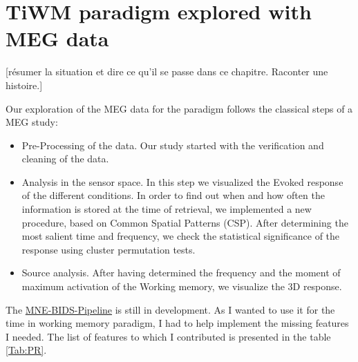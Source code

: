 \chapter{TiWM paradigm explored with MEG data}




 [résumer la situation et dire ce qu'il se passe dans ce chapitre. Raconter une histoire.]


Our exploration of the MEG data for the paradigm follows the classical steps of a MEG study:

\begin{itemize}
    \item Pre-Processing of the data. Our study started with the verification and cleaning of the data.
    \item Analysis in the sensor space. In this step we visualized the Evoked response of the different conditions. In order to find out when and how often the information is stored at the time of retrieval, we implemented a new procedure, based on Common Spatial Patterns (CSP). After determining the most salient time and frequency, we check the statistical significance of the response using cluster permutation tests.
    \item Source analysis. After having determined the frequency and the moment of maximum activation of the Working memory, we visualize the 3D response.
\end{itemize}


The \href{https://github.com/mne-tools/mne-bids-pipeline}{MNE-BIDS-Pipeline} is still in development. As I wanted to use it for the time in working memory paradigm, I had to help implement the missing features I needed. The list of features to which I contributed is presented in the table \ref{Tab:PR}.

